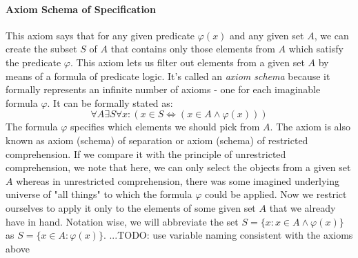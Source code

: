 
\paragraph{Axiom Schema of Specification}
This axiom says that for any given predicate $\varphi(x)$ and any given set $A$, we can create the subset $S$ of $A$ that contains only those elements from $A$ which satisfy the predicate $\varphi$. This axiom lets us filter out elements from a given set $A$ by means of a formula of predicate logic. It's called an \emph{axiom schema} because it formally represents an infinite number of axioms - one for each imaginable formula $\varphi$. It can be formally stated as:
\begin{equation}
\forall A \exists S \forall x: (x \in S \Leftrightarrow (x \in A \wedge \varphi(x)) )
\end{equation}
The formula $\varphi$ specifies which elements we should pick from $A$. The axiom is also known as axiom (schema) of separation or axiom (schema) of restricted comprehension. If we compare it with the principle of unrestricted comprehension, we note that here, we can only select the objects from a given set $A$ whereas in unrestricted comprehension, there was some imagined underlying universe of "all things" to which the formula $\varphi$ could be applied. Now we restrict ourselves to apply it only to the elements of some given set $A$ that we already have in hand. Notation wise, we will abbreviate the set $S = \{ x : x \in A \wedge \varphi(x) \}$ as $S = \{ x \in A :  \varphi(x) \}$. ...TODO: use variable naming consistent with the axioms above







